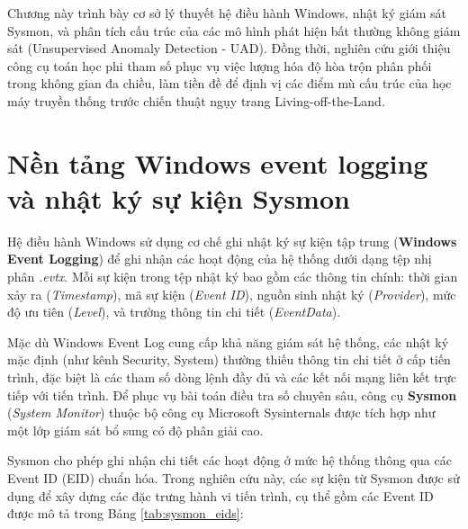 ﻿\documentclass[../main.tex]{subfiles}
\begin{document}
Chương này trình bày cơ sở lý thuyết hệ điều hành Windows, nhật ký giám sát Sysmon, và phân tích cấu trúc của các mô hình phát hiện bất thường không giám sát (Unsupervised Anomaly Detection - UAD). Đồng thời, nghiên cứu giới thiệu công cụ toán học phi tham số phục vụ việc lượng hóa độ hòa trộn phân phối trong không gian đa chiều, làm tiền đề để định vị các điểm mù cấu trúc của học máy truyền thống trước chiến thuật ngụy trang Living-off-the-Land.

\section{Nền tảng Windows event logging và nhật ký sự kiện Sysmon}
\label{section:1.1}

Hệ điều hành Windows sử dụng cơ chế ghi nhật ký sự kiện tập trung (\textbf{Windows Event Logging}) để ghi nhận các hoạt động của hệ thống dưới dạng tệp nhị phân \textit{.evtx}. Mỗi sự kiện trong tệp nhật ký bao gồm các thông tin chính: thời gian xảy ra (\textit{Timestamp}), mã sự kiện (\textit{Event ID}), nguồn sinh nhật ký (\textit{Provider}), mức độ ưu tiên (\textit{Level}), và trường thông tin chi tiết (\textit{EventData}). 

Mặc dù Windows Event Log cung cấp khả năng giám sát hệ thống, các nhật ký mặc định (như kênh Security, System) thường thiếu thông tin chi tiết ở cấp tiến trình, đặc biệt là các tham số dòng lệnh đầy đủ và các kết nối mạng liên kết trực tiếp với tiến trình. Để phục vụ bài toán điều tra số chuyên sâu, công cụ \textbf{Sysmon} (\textit{System Monitor}) thuộc bộ công cụ Microsoft Sysinternals được tích hợp như một lớp giám sát bổ sung có độ phân giải cao.

Sysmon cho phép ghi nhận chi tiết các hoạt động ở mức hệ thống thông qua các Event ID (EID) chuẩn hóa. Trong nghiên cứu này, các sự kiện từ Sysmon được sử dụng để xây dựng các đặc trưng hành vi tiến trình, cụ thể gồm các Event ID được mô tả trong Bảng \ref{tab:sysmon_eids}:
\end{document}
